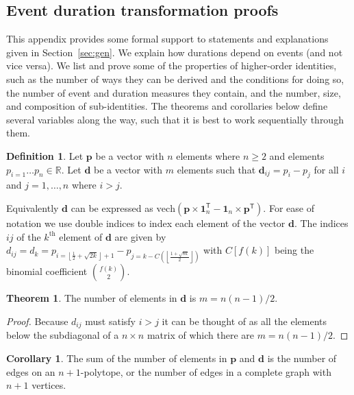 \documentclass[12pt,oneside,a4paper]{article} %
\theoremstyle{definition}
\newtheorem{definition}{Definition}[section]
\newtheorem{theorem}{Theorem}[section]
\newtheorem{corollary}{Corollary}[theorem]
\begin{document}
\begin{appendices}
\section{Event duration transformation proofs}
\label{app:A}
This appendix provides some formal support to statements and explanations given
in Section~\ref{sec:gen}. We explain how durations depend on events (and not
vice versa). We list and prove some of the properties of higher-order
identities, such as the number of ways they can be derived and the conditions
for doing so, the number of event and duration measures they contain, and the
number, size, and composition of sub-identities. The theorems and corollaries
below define several variables along the way, such that it is best to work
sequentially through them.

\begin{definition} Let $\textbf{p}$ be a vector with $n$ elements where $n \geq
2$ and elements $p_{i=1} \ldots p_n \in \mathbb{R}$. Let $\textbf{d}$ be a vector with $m$ elements such that $\textbf{d}_{ij} = p_i - p_j$ for all $i$ and $j = 1, \ldots, n$ where $i>j$.
\end{definition}

Equivalently $\textbf{d}$ can be expressed as $\text{vech}(\textbf{p}\times
\textbf{1}_n^\textsf{T} - \textbf{1}_n \times \textbf{p}^\textsf{T})$. For ease
of notation we use double indices to index each element of the vector
$\textbf{d}$. The indices $ij$ of the $k^\text{th}$ element of $\textbf{d}$ are
given by $d_{ij} = d_k = p_{i=\left\lfloor \frac
{1}{2}+\sqrt{2k}\right\rfloor+1} - p_{j=k-C\left(\left\lfloor
\frac{1+\sqrt{8k}}{2}\right\rfloor\right)}$ with $C[f(k)]$ being the binomial
coefficient $\binom{f(k)}{2}$.

\begin{theorem} 
The number of elements in $\textbf{d}$ is $m = n(n-1)/2$.
\end{theorem}

\begin{proof} 
Because $d_{ij}$ must satisfy $i > j$ it can be thought of as all
the elements below the subdiagonal of a $n\times n$ matrix of which there are $m = n(n-1)/2$.
\end{proof}

\begin{corollary} 
The sum of the number of elements in $\textbf{p}$ and
$\textbf{d}$ is the number of edges on an $n+1$-polytope, or the number of edges
in a complete graph with $n+1$ vertices.
\end{corollary}


\end{appendices}
\end{document}
